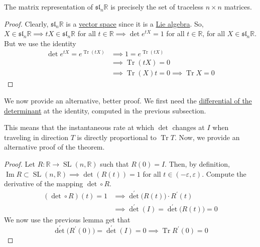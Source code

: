 \documentclass{article}
\DeclareMathOperator{\Tr}{Tr}
\DeclareMathOperator{\im}{Im}
\DeclareMathOperator{\SL}{SL}
\newcounter{theorem}[section]
\newcounter{definition}[section]
\begin{document}
    \begin{theorem}
      \label{thm:matrix-form-of-mathfrakslnr}
      The matrix representation of $\mathfrak{sl}_n \mathbb{R}$ is precisely the set of traceless $n \times n$ matrices. 
    \end{theorem}

    \begin{proof}
      Clearly, $\mathfrak{sl}_n \mathbb{R}$ is a \hyperref[lin-def:vector-space]{vector space} since it is a \hyperref[def:lie-algebra]{Lie algebra}. So, $X \in \mathfrak{sl}_n \mathbb{R} \implies t X \in \mathfrak{sl}_n \mathbb{R}$ for all $t \in \mathbb{R} \implies \det{e^{tX}} = 1$ for all $t \in \mathbb{R}$, for all $X \in \mathfrak{sl}_n \mathbb{R}$. But we use the identity 
      \begin{align*}
        \det{e^{tX}} = e^{\Tr{(tX)}} & \implies 1 = e^{\Tr{(t X)}} \\
        & \implies \Tr{(tX)} = 0 \\
        & \implies \Tr{(X)} t = 0 \implies \Tr{X} = 0
      \end{align*}
    \end{proof}
    We now provide an alternative, better proof. We first need the \hyperref[thm:differential-of-the-determinant-at-the-identity]{differential of the determinant} at the identity, computed in the previous subsection. 



    This means that the instantaneous rate at which $\det$ changes at $I$ when traveling in direction $T$ is directly proportional to $\Tr{T}$. Now, we provide an alternative proof of the theorem. 
    \begin{proof}
      Let $R: \mathbb{R} \rightarrow \SL(n, \mathbb{R})$ such that $R(0) = I$. Then, by definition, $\im{R} \subset \SL(n, \mathbb{R}) \implies \det{(R(t))} = 1$ for all $t \in (-\varepsilon, \varepsilon)$. Compute the derivative of the mapping $\det \circ R$. 
      \begin{align*}
          (\det \circ  R) (t) = 1 & \implies \det^\prime \big( R(t) \big) \cdot R^\prime (t) \\ 
          & \implies \det^\prime (I) = \det^\prime \big(R(t)\big) = 0 
      \end{align*}
      We now use the previous lemma get that 
      \begin{equation}
        \det^\prime \big( R^\prime(0)\big) = \det^\prime (I)=0 \implies \Tr{R^\prime(0)} = 0
      \end{equation}
    \end{proof} 
\end{document}
